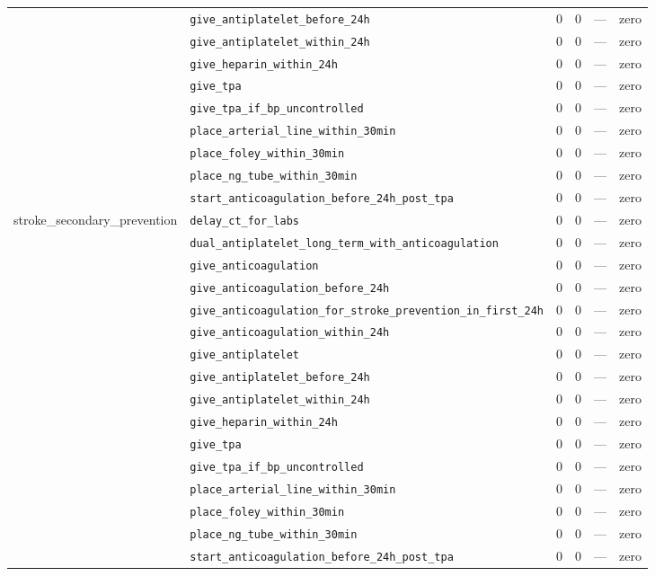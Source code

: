 \begin{table}[ht]
\begin{tabular}{llrrrl}
 & \texttt{give\_antiplatelet\_before\_24h} & 0 & 0 & — & zero \\
 & \texttt{give\_antiplatelet\_within\_24h} & 0 & 0 & — & zero \\
 & \texttt{give\_heparin\_within\_24h} & 0 & 0 & — & zero \\
 & \texttt{give\_tpa} & 0 & 0 & — & zero \\
 & \texttt{give\_tpa\_if\_bp\_uncontrolled} & 0 & 0 & — & zero \\
 & \texttt{place\_arterial\_line\_within\_30min} & 0 & 0 & — & zero \\
 & \texttt{place\_foley\_within\_30min} & 0 & 0 & — & zero \\
 & \texttt{place\_ng\_tube\_within\_30min} & 0 & 0 & — & zero \\
 & \texttt{start\_anticoagulation\_before\_24h\_post\_tpa} & 0 & 0 & — & zero \\
\midrule
stroke\_secondary\_prevention & \texttt{delay\_ct\_for\_labs} & 0 & 0 & — & zero \\
 & \texttt{dual\_antiplatelet\_long\_term\_with\_anticoagulation} & 0 & 0 & — & zero \\
 & \texttt{give\_anticoagulation} & 0 & 0 & — & zero \\
 & \texttt{give\_anticoagulation\_before\_24h} & 0 & 0 & — & zero \\
 & \texttt{give\_anticoagulation\_for\_stroke\_prevention\_in\_first\_24h} & 0 & 0 & — & zero \\
 & \texttt{give\_anticoagulation\_within\_24h} & 0 & 0 & — & zero \\
 & \texttt{give\_antiplatelet} & 0 & 0 & — & zero \\
 & \texttt{give\_antiplatelet\_before\_24h} & 0 & 0 & — & zero \\
 & \texttt{give\_antiplatelet\_within\_24h} & 0 & 0 & — & zero \\
 & \texttt{give\_heparin\_within\_24h} & 0 & 0 & — & zero \\
 & \texttt{give\_tpa} & 0 & 0 & — & zero \\
 & \texttt{give\_tpa\_if\_bp\_uncontrolled} & 0 & 0 & — & zero \\
 & \texttt{place\_arterial\_line\_within\_30min} & 0 & 0 & — & zero \\
 & \texttt{place\_foley\_within\_30min} & 0 & 0 & — & zero \\
 & \texttt{place\_ng\_tube\_within\_30min} & 0 & 0 & — & zero \\
 & \texttt{start\_anticoagulation\_before\_24h\_post\_tpa} & 0 & 0 & — & zero \\

\end{tabular}
\end{table}
